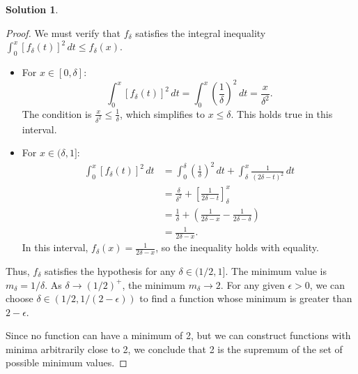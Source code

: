 \documentclass[12pt]{article}
\theoremstyle{definition}
\newtheorem*{solution}{\normalfont\textbf{Solution}}
\begin{document}
\begin{enumerate}[leftmargin=*]
\begin{solution}
\begin{proof}
            We must verify that $f_\delta$ satisfies the integral inequality $\int_0^x [f_\delta(t)]^2 \,dt \leq f_\delta(x)$.
            \begin{itemize}
                \item For $x \in [0, \delta]$:
                \[
                \int_0^x [f_\delta(t)]^2 \,dt = \int_0^x \left(\frac{1}{\delta}\right)^2 \,dt = \frac{x}{\delta^2}.
                \]
                The condition is $\frac{x}{\delta^2} \leq \frac{1}{\delta}$, which simplifies to $x \leq \delta$. This holds true in this interval.

                \item For $x \in (\delta, 1]$:
                \begin{align*}
                \int_0^x [f_\delta(t)]^2 \,dt &= \int_0^\delta \left(\frac{1}{\delta}\right)^2 \,dt + \int_\delta^x \frac{1}{(2\delta - t)^2} \,dt \\
                &= \frac{\delta}{\delta^2} + \left[ \frac{1}{2\delta - t} \right]_\delta^x \\
                &= \frac{1}{\delta} + \left( \frac{1}{2\delta - x} - \frac{1}{2\delta - \delta} \right) \\
                &= \frac{1}{2\delta - x}.
                \end{align*}
                In this interval, $f_\delta(x) = \frac{1}{2\delta-x}$, so the inequality holds with equality.
            \end{itemize}
            Thus, $f_\delta$ satisfies the hypothesis for any $\delta \in (1/2, 1]$. The minimum value is $m_\delta = 1/\delta$.
            As $\delta \to (1/2)^+$, the minimum $m_\delta \to 2$. For any given $\epsilon > 0$, we can choose $\delta \in (1/2, 1/(2-\epsilon))$ to find a function whose minimum is greater than $2-\epsilon$.

            Since no function can have a minimum of 2, but we can construct functions with minima arbitrarily close to 2, we conclude that 2 is the supremum of the set of possible minimum values.
            \end{proof}                  
        \end{solution}



\end{enumerate}
\end{document}
